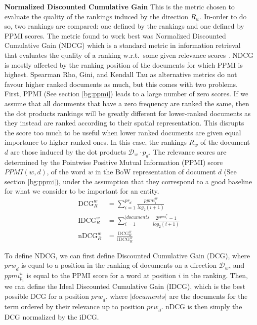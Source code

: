 \noindent \textbf{Normalized Discounted Cumulative Gain}\label{ch3:NDCG} %
This is the metric chosen to evaluate the quality of the rankings induced by the direction $R_w$. In-order to do so, two rankings are compared: one defined by the rankings and one defined by PPMI scores.  The metric found to work best was Normalized Discounted Cumulative Gain (NDCG) which is a standard metric in information retrieval that evaluates the quality of a ranking w.r.t.\ some given relevance scores \cite{jarvelin2002cumulated}.  NDCG is mostly affected by the ranking position of the documents for which PPMI is highest.  Spearman Rho, Gini, and Kendall Tau as alternative metrics  do not favour higher ranked documents as much, but this comes with two problems. First, PPMI (See section \ref{bg:ppmi}) leads to a large number of zero scores. If we assume that all documents that have a zero frequency are ranked the same, then the dot products rankings will be greatly different for lower-ranked documents as they instead are ranked according to their spatial representation. This disrupts the score too much to be useful when lower ranked documents are given equal importance to higher ranked ones. In this case, the rankings $R_w$ of the document $d$ are those induced by the dot products $\mathcal{D}_w \cdot p_d$. The relevance scores are determined by the Pointwise Positive Mutual Information (PPMI) score $\textit{PPMI}(w,d)$, of the word $w$ in the BoW representation of document $d$ (See section \ref{bg:ppmi}), under the assumption that they correspond to a good baseline for what we consider to be important for an entity. 
\begin{align*}
\text{DCG}_{R}^{w} &= \sum_{i=1}^{{pr}_d}\frac{\textit{ppmi}_{i}^{w}}{log_{2}(i + 1)} \\
\text{IDCG}_{R}^{w} &= \sum^{|\textit{documents}|}_{i=1} \frac{2^{\textit{ppmi}_{i}^{w}}-1}{log_{2}(i + 1)} \\
\text{nDCG}_{R}^{w} &= \frac{\text{DCG}_{R}^{w}}{\text{IDCG}_{R}^{w}}
\end{align*}  

To define NDCG, we can first define Discounted Cumulative Gain (DCG), where ${prw}_{d}$ is equal to a position in the ranking of documents on a direction $\mathcal{D}_w$, and $ppmi_{p_{i}}^{w}$ is equal to the PPMI score for a word at position $i$ in the ranking. Then, we can define the Ideal Discounted Cumulative Gain (IDCG), which is the best possible DCG for a position ${prw}_{d}$, where $|documents|$ are the documents for the term ordered by their relevance up to position ${prw}_{d}$. nDCG is then simply the DCG normalized by the iDCG.

